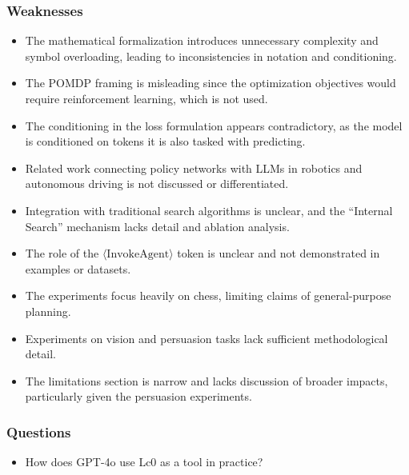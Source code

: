 \subsubsection*{Weaknesses}

\begin{itemize}
    \item The mathematical formalization introduces unnecessary complexity and symbol overloading, leading to inconsistencies in notation and conditioning.
    \item The POMDP framing is misleading since the optimization objectives would require reinforcement learning, which is not used.
    \item The conditioning in the loss formulation appears contradictory, as the model is conditioned on tokens it is also tasked with predicting.
    \item Related work connecting policy networks with LLMs in robotics and autonomous driving is not discussed or differentiated.
    \item Integration with traditional search algorithms is unclear, and the ``Internal Search'' mechanism lacks detail and ablation analysis.
    \item The role of the $\langle \text{InvokeAgent} \rangle$ token is unclear and not demonstrated in examples or datasets.
    \item The experiments focus heavily on chess, limiting claims of general-purpose planning.
    \item Experiments on vision and persuasion tasks lack sufficient methodological detail.
    \item The limitations section is narrow and lacks discussion of broader impacts, particularly given the persuasion experiments.
\end{itemize}

\subsubsection*{Questions}

\begin{itemize}
    \item How does GPT-4o use Lc0 as a tool in practice?
\end{itemize}

